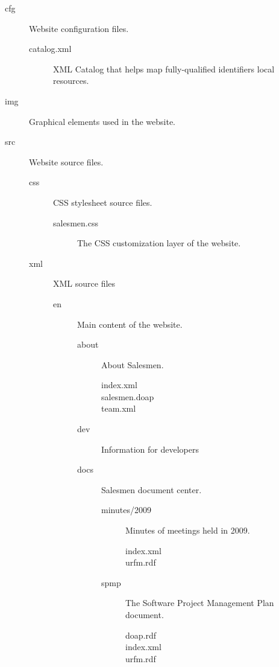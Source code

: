 \begin{description}
\item[cfg] Website configuration files.
  \begin{description}
  \item[catalog.xml] XML Catalog that helps map fully-qualified identifiers
    local resources.
  \end{description}
\item[img] Graphical elements used in the website.
\item[src] Website source files.
  \begin{description}
  \item[css] CSS stylesheet source files.
    \begin{description}
    \item[salesmen.css] The CSS customization layer of the website.
    \end{description}
  \item[xml] XML source files
    \begin{description}
    \item[en] Main content of the website.
      \begin{description}
      \item[about] About Salesmen.
        \begin{description}
        \item[index.xml]
        \item[salesmen.doap]
        \item[team.xml]
        \end{description}
      \item[dev] Information for developers
      \item[docs] Salesmen document center.
        \begin{description}
        \item[minutes/2009] Minutes of meetings held in 2009.
          \begin{description}
          \item[index.xml]
          \item[urfm.rdf]
          \end{description}
        \item[spmp] The Software Project Management Plan document.
          \begin{description}
          \item[doap.rdf]
          \item[index.xml]
          \item[urfm.rdf]

\end{description}
\end{description}
\end{description}
\end{description}
\end{description}
\end{description}
